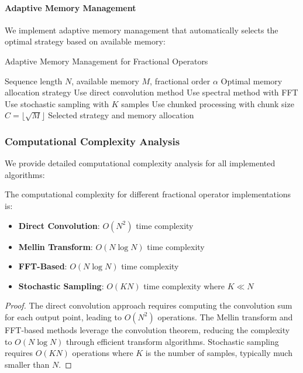 \paragraph{Adaptive Memory Management}

We implement adaptive memory management that automatically selects the optimal strategy based on available memory:

\begin{algorithm}[h]
\caption{Adaptive Memory Management for Fractional Operators}
\begin{algorithmic}[1]
\REQUIRE Sequence length $N$, available memory $M$, fractional order $\alpha$
\ENSURE Optimal memory allocation strategy
    \STATE Use direct convolution method
    \STATE Use spectral method with FFT
    \STATE Use stochastic sampling with $K$ samples
\ELSE
    \STATE Use chunked processing with chunk size $C = \lfloor \sqrt{M} \rfloor$
\ENDIF
\RETURN Selected strategy and memory allocation
\end{algorithmic}
\end{algorithm}

\subsubsection{Computational Complexity Analysis}

We provide detailed computational complexity analysis for all implemented algorithms:

\begin{theorem}
The computational complexity for different fractional operator implementations is:
\begin{itemize}
\item \textbf{Direct Convolution}: $O(N^2)$ time complexity
\item \textbf{Mellin Transform}: $O(N \log N)$ time complexity
\item \textbf{FFT-Based}: $O(N \log N)$ time complexity
\item \textbf{Stochastic Sampling}: $O(KN)$ time complexity where $K \ll N$
\end{itemize}
\end{theorem}

\begin{proof}
The direct convolution approach requires computing the convolution sum for each output point, leading to $O(N^2)$ operations. The Mellin transform and FFT-based methods leverage the convolution theorem, reducing the complexity to $O(N \log N)$ through efficient transform algorithms. Stochastic sampling requires $O(KN)$ operations where $K$ is the number of samples, typically much smaller than $N$.
\end{proof}

